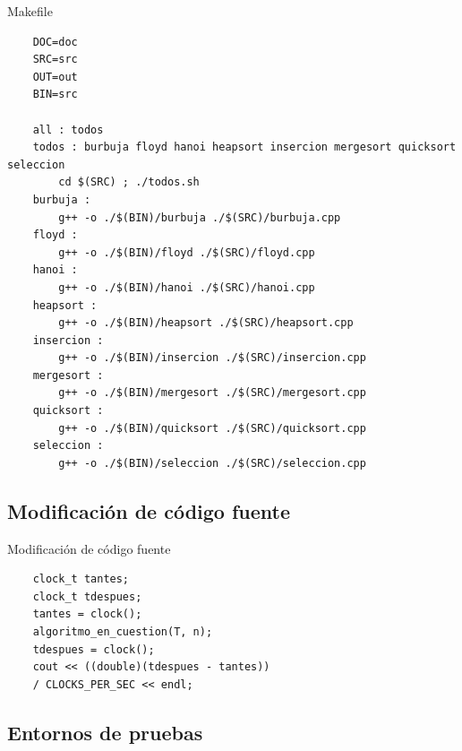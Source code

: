 \documentclass{beamer}
\begin{document}
\begin{frame}[fragile]{Makefile}

\begin{verbatim}
	DOC=doc
	SRC=src
	OUT=out
	BIN=src

	all : todos
	todos : burbuja floyd hanoi heapsort insercion mergesort quicksort seleccion
		cd $(SRC) ; ./todos.sh
	burbuja : 
		g++ -o ./$(BIN)/burbuja ./$(SRC)/burbuja.cpp
	floyd : 
		g++ -o ./$(BIN)/floyd ./$(SRC)/floyd.cpp
	hanoi : 
		g++ -o ./$(BIN)/hanoi ./$(SRC)/hanoi.cpp
	heapsort : 
		g++ -o ./$(BIN)/heapsort ./$(SRC)/heapsort.cpp
	insercion : 
		g++ -o ./$(BIN)/insercion ./$(SRC)/insercion.cpp
	mergesort : 
		g++ -o ./$(BIN)/mergesort ./$(SRC)/mergesort.cpp
	quicksort : 
		g++ -o ./$(BIN)/quicksort ./$(SRC)/quicksort.cpp
	seleccion :
		g++ -o ./$(BIN)/seleccion ./$(SRC)/seleccion.cpp
\end{verbatim}  
\end{frame}


\subsection{Modificación de código fuente}

\begin{frame}[fragile]{Modificación de código fuente}
\begin{verbatim}
	clock_t tantes;
	clock_t tdespues;
	tantes = clock();
	algoritmo_en_cuestion(T, n);
	tdespues = clock();
	cout << ((double)(tdespues - tantes))
	/ CLOCKS_PER_SEC << endl;
\end{verbatim}
\end{frame}

\subsection{Entornos de pruebas}
\end{document}
